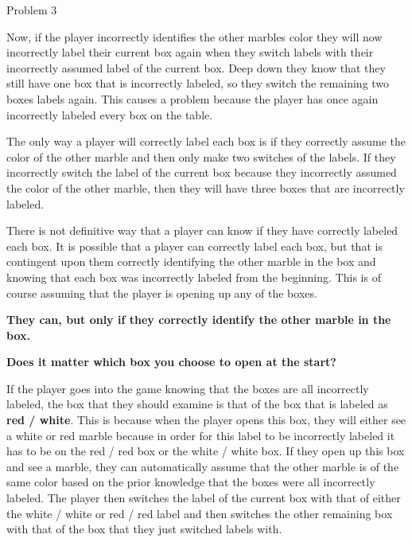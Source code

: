 \begin{problem}{Problem 3}
\begin{highlight}[Solution]
        Now, if the player incorrectly identifies the other marbles color they will now incorrectly label their current box again when they switch labels with their incorrectly assumed label of the current box.
        Deep down they know that they still have one box that is incorrectly labeled, so they switch the remaining two boxes labels again. This causes a problem because the player has once again incorrectly labeled
        every box on the table.

        The only way a player will correctly label each box is if they correctly assume the color of the other marble and then only make two switches of the labels. If they incorrectly switch the label of the
        current box because they incorrectly assumed the color of the other marble, then they will have three boxes that are incorrectly labeled.

        There is not definitive way that a player can know if they have correctly labeled each box. It is possible that a player can correctly label each box, but that is contingent upon them correctly identifying
        the other marble in the box and knowing that each box was incorrectly labeled from the beginning. This is of course assuming that the player is opening up any of the boxes.

        \begin{center}
            \textbf{They can, but only if they correctly identify the other marble in the box.}
        \end{center}

        \noindent \textbf{Does it matter which box you choose to open at the start?} \vspace*{1em}

        If the player goes into the game knowing that the boxes are all incorrectly labeled, the box that they should examine is that of the box that is labeled as \textbf{red / white}. This is because when the player
        opens this box, they will either see a white or red marble because in order for this label to be incorrectly labeled it has to be on the red / red box or the white / white box. If they open up this box and see
        a marble, they can automatically assume that the other marble is of the same color based on the prior knowledge that the boxes were all incorrectly labeled. The player then switches the label of the current box
        with that of either the white / white or red / red label and then switches the other remaining box with that of the box that they just switched labels with. 


\end{highlight}
\end{problem}
